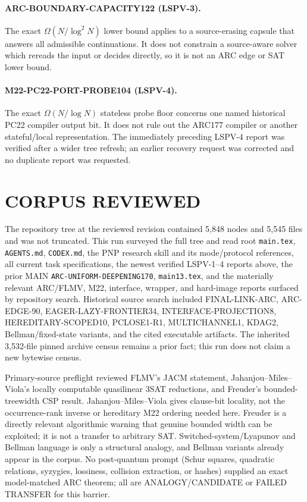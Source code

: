 \documentclass[11pt]{article}
\begin{document}
\paragraph{ARC-BOUNDARY-CAPACITY122 (LSPV-3).}
The exact $\Omega(N/\log^2N)$ lower bound applies to a source-erasing capsule
that answers all admissible continuations.  It does not constrain a
source-aware solver which rereads the input or decides directly, so it is not
an ARC edge or SAT lower bound.

\paragraph{M22-PC22-PORT-PROBE104 (LSPV-4).}
The exact $\Omega(N/\log N)$ stateless probe floor concerns one named
historical PC22 compiler output bit.  It does not rule out the ARC177 compiler
or another stateful/local representation.  The immediately preceding LSPV-4
report was verified after a wider tree refresh; an earlier recovery request
was corrected and no duplicate report was requested.

\section{CORPUS REVIEWED}
The repository tree at the reviewed revision contained 5,848 nodes and 5,545
files and was not truncated.  This run surveyed the full tree and read root
\texttt{main.tex}, \texttt{AGENTS.md}, \texttt{CODEX.md}, the PNP research
skill and its mode/protocol references, all current task specifications, the
newest verified LSPV-1--4 reports above, the prior MAIN
\texttt{ARC-UNIFORM-DEEPENING170}, \texttt{main13.tex}, and the materially
relevant ARC/FLMV, M22, interface, wrapper, and hard-image reports surfaced by
repository search.  Historical source search included
FINAL-LINK-ARC, ARC-EDGE-90, EAGER-LAZY-FRONTIER34,
INTERFACE-PROJECTION8, HEREDITARY-SCOPED10, PCLOSE1-R1, MULTICHANNEL1,
KDAG2, Bellman/fixed-state variants, and the cited executable artifacts.
The inherited 3,532-file pinned archive census remains a prior fact; this run
does not claim a new bytewise census.

Primary-source preflight reviewed FLMV's JACM statement, Jahanjou--Miles--
Viola's locally computable quasilinear 3SAT reductions, and Freuder's
bounded-treewidth CSP result.  Jahanjou--Miles--Viola gives clause-bit
locality, not the occurrence-rank inverse or hereditary M22 ordering needed
here.  Freuder is a directly relevant algorithmic warning that genuine
bounded width can be exploited; it is not a transfer to arbitrary SAT.
Switched-system/Lyapunov and Bellman language is only a structural analogy,
and Bellman variants already appear in the corpus.  No post-quantum prompt
(Schur squares, quadratic relations, syzygies, lossiness, collision
extraction, or hashes) supplied an exact model-matched ARC theorem; all are
ANALOGY/CANDIDATE or FAILED TRANSFER for this barrier.
\end{document}
